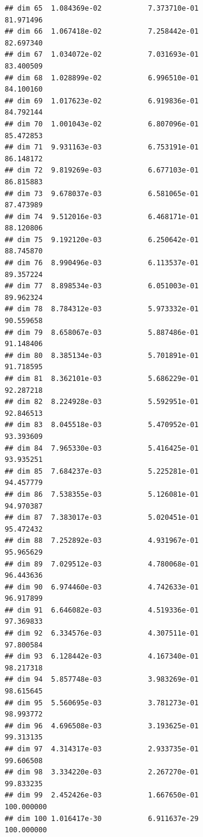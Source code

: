 \documentclass[
]{book}
\begin{document}
\begin{verbatim}
## dim 65  1.084369e-02           7.373710e-01                         81.971496
## dim 66  1.067418e-02           7.258442e-01                         82.697340
## dim 67  1.034072e-02           7.031693e-01                         83.400509
## dim 68  1.028899e-02           6.996510e-01                         84.100160
## dim 69  1.017623e-02           6.919836e-01                         84.792144
## dim 70  1.001043e-02           6.807096e-01                         85.472853
## dim 71  9.931163e-03           6.753191e-01                         86.148172
## dim 72  9.819269e-03           6.677103e-01                         86.815883
## dim 73  9.678037e-03           6.581065e-01                         87.473989
## dim 74  9.512016e-03           6.468171e-01                         88.120806
## dim 75  9.192120e-03           6.250642e-01                         88.745870
## dim 76  8.990496e-03           6.113537e-01                         89.357224
## dim 77  8.898534e-03           6.051003e-01                         89.962324
## dim 78  8.784312e-03           5.973332e-01                         90.559658
## dim 79  8.658067e-03           5.887486e-01                         91.148406
## dim 80  8.385134e-03           5.701891e-01                         91.718595
## dim 81  8.362101e-03           5.686229e-01                         92.287218
## dim 82  8.224928e-03           5.592951e-01                         92.846513
## dim 83  8.045518e-03           5.470952e-01                         93.393609
## dim 84  7.965330e-03           5.416425e-01                         93.935251
## dim 85  7.684237e-03           5.225281e-01                         94.457779
## dim 86  7.538355e-03           5.126081e-01                         94.970387
## dim 87  7.383017e-03           5.020451e-01                         95.472432
## dim 88  7.252892e-03           4.931967e-01                         95.965629
## dim 89  7.029512e-03           4.780068e-01                         96.443636
## dim 90  6.974460e-03           4.742633e-01                         96.917899
## dim 91  6.646082e-03           4.519336e-01                         97.369833
## dim 92  6.334576e-03           4.307511e-01                         97.800584
## dim 93  6.128442e-03           4.167340e-01                         98.217318
## dim 94  5.857748e-03           3.983269e-01                         98.615645
## dim 95  5.560695e-03           3.781273e-01                         98.993772
## dim 96  4.696508e-03           3.193625e-01                         99.313135
## dim 97  4.314317e-03           2.933735e-01                         99.606508
## dim 98  3.334220e-03           2.267270e-01                         99.833235
## dim 99  2.452426e-03           1.667650e-01                        100.000000
## dim 100 1.016417e-30           6.911637e-29                        100.000000
\end{verbatim}
\end{document}
